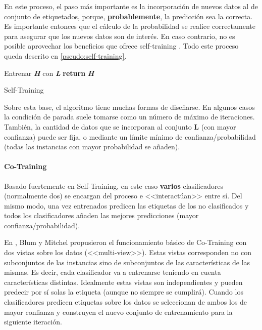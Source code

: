 En este proceso, el paso más importante es la incorporación de nuevos datos al
de conjunto de etiquetados, porque, \textbf{probablemente}, la predicción sea la
correcta. Es importante entonces que el cálculo de la probabilidad se realice
correctamente para asegurar que los nuevos datos son de interés. En caso
contrario, no es posible aprovechar los beneficios que ofrece self-training
\cite{vanEngelen2020}. Todo este proceso queda descrito en
\ref{pseudo:self-training}.

\begin{algorithm}
     Entrenar \textbf{\textit{H}} con \textbf{\textit{L}}\;
     \textbf{return} \textbf{\textit{H}}
     \caption{Self-Training}\label{pseudo:self-training}
\end{algorithm}

Sobre esta base, el algoritmo tiene muchas formas de diseñarse. En algunos casos
la condición de parada suele tomarse como un número de máximo de iteraciones.
También, la cantidad de datos que se incorporan al conjunto \textbf{L} (con
mayor confianza) puede ser fija, o mediante un límite mínimo de
confianza/probabilidad (todas las instancias con mayor probabilidad se añaden).

\paragraph{Co-Training}
Basado fuertemente en Self-Training, en este caso \textbf{varios} clasificadores
(normalmente dos) se encargan del proceso e <<interactúan>> entre sí. Del mismo
modo, una vez entrenados predicen las etiquetas de los no clasificados y todos
los clasificadores añaden las mejores predicciones (mayor
confianza/probabilidad).

En \cite{blum1998combining}, Blum y Mitchel propusieron el funcionamiento básico
de Co-Training con dos vistas sobre los datos (<<multi-view>>). Estas vistas
corresponden no con subconjuntos de las instancias sino de subconjuntos de las
características de las mismas. Es decir, cada clasificador va a entrenarse
teniendo en cuenta características distintas. Idealmente estas vistas son
independientes y pueden predecir por sí solas la etiqueta (aunque no siempre se
cumplirá). Cuando los clasificadores predicen etiquetas sobre los datos se
seleccionan de ambos los de mayor confianza y construyen el nuevo conjunto de
entrenamiento para la siguiente iteración.


